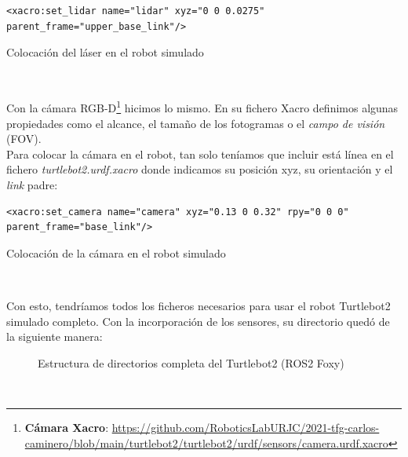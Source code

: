 \begin{code}[H]
\begin{lstlisting}
<xacro:set_lidar name="lidar" xyz="0 0 0.0275" parent_frame="upper_base_link"/>
\end{lstlisting}
\caption{Colocación del láser en el robot simulado}
\label{fig:colocacion_laser_simulado}
\end{code}\

Con la cámara RGB-D\footnote{\textbf{Cámara Xacro}: \url{https://github.com/RoboticsLabURJC/2021-tfg-carlos-caminero/blob/main/turtlebot2/turtlebot2/urdf/sensors/camera.urdf.xacro}} hicimos lo mismo. En su fichero Xacro definimos algunas propiedades como el alcance, el tamaño de los fotogramas o el \textit{campo de visión} (FOV).\\

Para colocar la cámara en el robot, tan solo teníamos que incluir está línea en el fichero \textit{turtlebot2.urdf.xacro} donde indicamos su posición xyz, su orientación y el \textit{link} padre:\\

\begin{code}[H]
\begin{lstlisting}
<xacro:set_camera name="camera" xyz="0.13 0 0.32" rpy="0 0 0" parent_frame="base_link"/>
\end{lstlisting}
\caption{Colocación de la cámara en el robot simulado}
\label{fig:colocacion_camara_simulado}
\end{code}\

Con esto, tendríamos todos los ficheros necesarios para usar el robot Turtlebot2 simulado completo. Con la incorporación de los sensores, su directorio quedó de la siguiente manera:

\begin{figure}[H]
	\begin{center}
	    \setlength{\fboxsep}{0.5cm}
	    \caption{Estructura de directorios completa del Turtlebot2 (ROS2 Foxy)}
	    \label{fig:directorios_turtlebot2}
	\end{center}
\end{figure}\

